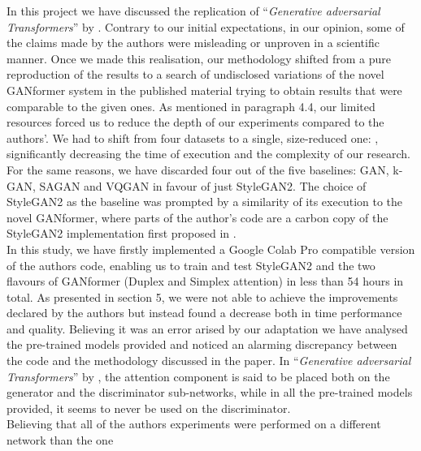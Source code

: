 \documentclass{article}
\begin{document}
	In this project we have discussed the replication of ``\emph{Generative adversarial Transformers}'' 
	by 
	\citet{hudson2021generative}.
	Contrary to our initial expectations, in our opinion, some of the claims made by the authors were 
	misleading or unproven in a scientific manner.
	Once we made this realisation, our methodology shifted from a pure reproduction of the results to a 
	search of undisclosed variations of the novel GANformer system in the published material trying to 
	obtain 
	results that were comparable to the given ones.
	As mentioned in paragraph 4.4, our limited resources forced us to reduce the depth of our 
	experiments 
	compared to the authors'.
	We had to shift from four datasets to a single, size-reduced one: \citet{cartoonset}, significantly 
	decreasing the time of execution and the complexity of our research.
	For the same reasons, we have discarded four out of the five baselines: GAN, k-GAN, SAGAN and 
	VQGAN 
	in favour of just StyleGAN2.
	The choice of StyleGAN2 as the baseline was prompted by a similarity of its execution to the novel 
	GANformer, where parts of the author's code are a carbon copy of the StyleGAN2 implementation 
	first 
	proposed in \citet{karras2019style}.
	\\
	In this study, we have firstly implemented a Google Colab Pro compatible version of the authors 
	code, 
	enabling us to train and test StyleGAN2 and the two flavours of GANformer (Duplex and Simplex 
	attention) 
	in less than 54 hours in total.
	As presented in section 5, we were not able to achieve the improvements declared by the authors 
	but instead 
	found a decrease both in time performance and quality.
	Believing it was an error arised by our adaptation we have analysed the pre-trained models provided 
	and 
	noticed an alarming discrepancy between the code and the methodology discussed in the paper.
	In ``\emph{Generative adversarial Transformers}'' by \citet{hudson2021generative}, the attention 
	component 
	is said to be placed both on the generator and the discriminator sub-networks, while in all the 
	pre-trained 
	models provided, it seems to never be used on the discriminator.
	\\
	Believing that all of the authors experiments were performed on a different network than the one 
\end{document}
